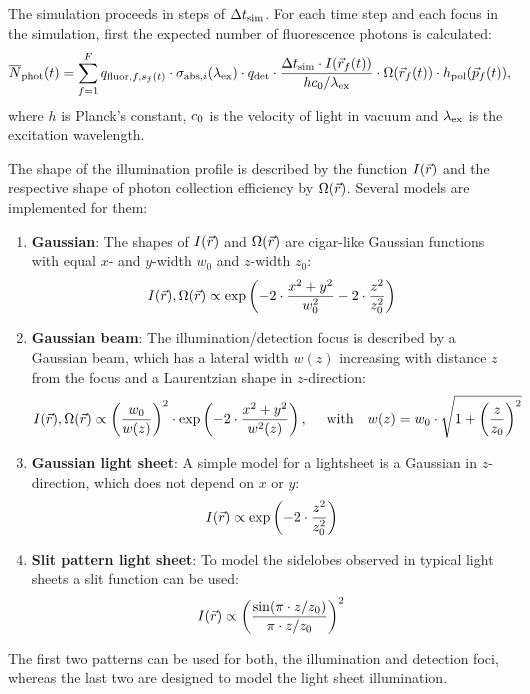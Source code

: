 The simulation proceeds in steps of $\Delta t_{\text{sim}}$. For each time step and each focus in the simulation, first the expected number of fluorescence photons is calculated:
\begin{equation}\label{eq:app_sim_fcs_nphoton}
  \overline{N}_{\text{phot}}(t)=\sum\limits_{f=1}^Fq_{{\text{fluor}},f,s_f(t)}\cdot\sigma_{{\text{abs}},i}(\lambda_{\text{ex}})\cdot q_{\text{det}}\cdot \frac{\Delta t_{\text{sim}}\cdot I(\vec{r}_f(t))}{hc_0/\lambda_{\text{ex}}}\cdot \Omega(\vec{r}_f(t))\cdot h_{\text{pol}}(\vec{p}_f(t)),
\end{equation}
where $h$ is Planck's constant, $c_0$ is the velocity of light in vacuum and $\lambda_{\text{ex}}$ is the excitation wavelength. 

The shape of the illumination profile is described by the function $I(\vec{r})$ and the respective shape of photon collection efficiency by $\Omega(\vec{r})$. Several models are implemented for them:
\begin{enumerate}
	\item \textbf{Gaussian}: The shapes of $I(\vec{r})$ and $\Omega(\vec{r})$ are cigar-like Gaussian functions with equal $x$- and $y$-width $w_0$ and $z$-width $z_0$:
					\begin{equation}\label{eq:sim3} I(\vec{r}),\Omega(\vec{r})\propto\exp\left(-2\cdot\frac{x^2+y^2}{w_0^2}-2\cdot\frac{z^2}{z_0^2}\right) \end{equation}
	\item \textbf{Gaussian beam}: The illumination/detection focus is described by a Gaussian beam, which has a lateral width $w(z)$ increasing with distance $z$ from the focus and a Laurentzian shape in $z$-direction:  
					\begin{equation}\label{eq:sim4} I(\vr),\Omega(\vr)\propto\left(\frac{w_0}{w(z)}\right)^2\cdot\exp\left(-2\cdot\frac{x^2+y^2}{w^2(z)}\right),\ \ \ \ \text{with}\ \ \ w(z)=w_0\cdot\sqrt{1+\left(\frac{z}{z_0}\right)^2} \end{equation}
	\item \textbf{Gaussian light sheet}: A simple model for a lightsheet is a Gaussian in $z$-direction, which does not depend on $x$ or $y$:
					\begin{equation}\label{eq:sim5} I(\vec{r})\propto\exp\left(-2\cdot\frac{z^2}{z_0^2}\right) \end{equation}
	\item \textbf{Slit pattern light sheet}: To model the sidelobes observed in typical light sheets a slit function can be used:
					\begin{equation}\label{eq:sim6} I(\vec{r})\propto\left(\frac{\sin(\pi\cdot z/z_0)}{\pi\cdot z/z_0}\right)^2 \end{equation}
\end{enumerate}
The first two patterns can be used for both, the illumination and detection foci, whereas the last two are designed to model the light sheet illumination.

